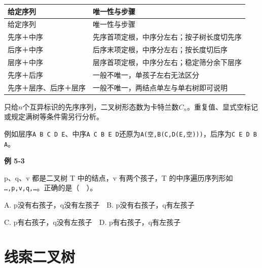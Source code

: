 \par\smallskip
{\fontsize{9.3}{12}\selectfont\setlength{\tabcolsep}{2.5pt}\setlength{\LTleft}{0pt}\setlength{\LTright}{0pt}
\begin{longtable}{@{}>{\raggedright\arraybackslash}p{}>{\raggedright\arraybackslash}p{}@{}}
\toprule
给定序列 & 唯一性与步骤 \\

\midrule\endfirsthead\toprule
给定序列 & 唯一性与步骤 \\

\midrule\endhead\bottomrule\endfoot
先序＋中序 & 先序首项定根，中序分左右；按子树长度切先序 \\

后序＋中序 & 后序末项定根，中序分左右；按长度切后序 \\

层序＋中序 & 层序首项定根，中序分左右；稳定筛分余下层序 \\

先序＋后序 & 一般不唯一，单孩子左右无法区分 \\

先序＋层序、后序＋层序 & 一般不唯一，两结点单左与单右树即可说明 \\

\end{longtable}}
\par\smallskip

只给\(n\)个互异标识的先序序列，二叉树形态数为卡特兰数\(C_n\)。重复值、显式空标记或规定满树等条件需另行分析。

例如层序\texttt{A B C D E}、中序\texttt{A C B E D}还原为\texttt{A(\allowbreak{}空,\allowbreak{}B(\allowbreak{}C,\allowbreak{}D(\allowbreak{}E,\allowbreak{}空)\allowbreak{})\allowbreak{})\allowbreak{}}，后序为\texttt{C E D B A}。

\par\medskip{}\noindent\hypertarget{DS05-E03}{}\label{DS05-E03}\textbf{例 5-3}\par\nobreak\smallskip

p、q、v 都是二叉树 T 中的结点，v 有两个孩子，T 的中序遍历序列形如 \texttt{…,\allowbreak{}p,\allowbreak{}v,\allowbreak{}q,\allowbreak{}…}。正确的是（　）。

A. p没有右孩子，q没有左孩子　B. p没有右孩子，q有左孩子

C. p有右孩子，q没有左孩子　D. p有右孩子，q有左孩子

\section{线索二叉树}\label{DS05-thread}

